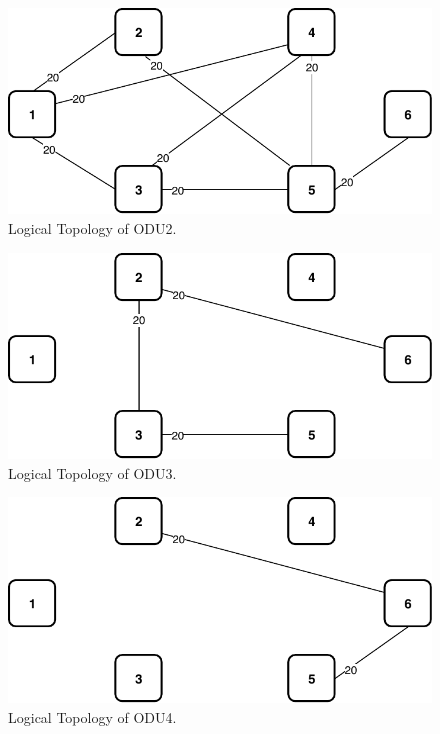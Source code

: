 \begin{figure}[h!]
\centering
\includegraphics[width=12cm]{sdf/ilp/opaque_survivability/figures/logical_topology_ODU2_high}
\caption{Logical Topology of ODU2.}
\label{logical_ODU2_high}
\end{figure}

\begin{figure}[h!]
\centering
\includegraphics[width=12cm]{sdf/ilp/opaque_survivability/figures/logical_topology_ODU3_high}
\caption{Logical Topology of ODU3.}
\label{logical_ODU3_high}
\end{figure}

\begin{figure}[h!]
\centering
\includegraphics[width=12cm]{sdf/ilp/opaque_survivability/figures/logical_topology_ODU4_high}
\caption{Logical Topology of ODU4.}
\label{logical_ODU4_high}
\end{figure}

